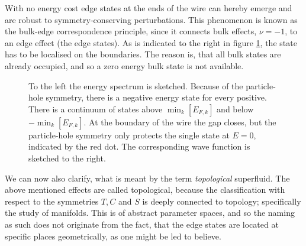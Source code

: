 With no energy cost edge states at the ends of the wire can hereby emerge and are robust to symmetry-conserving perturbations. This phenomenon is known as the bulk-edge correspondence principle, since it connects bulk effects, $\nu = -1$, to an edge effect (the edge states). As is indicated to the right in figure \ref{fig.edgestates}, the state has to be localised on the boundaries. The reason is, that all bulk states are already occupied, and so a zero energy bulk state is not available. 

\begin{figure}
\center
{}
\caption{To the left the energy spectrum is sketched. Because of the particle-hole symmetry, there is a negative energy state for every positive. There is a continuum of states above $\min_k[E_{F,k}]$ and below $-\min_k[E_{F,k}]$. At the boundary of the wire the gap closes, but the particle-hole symmetry only protects the single state at $E = 0$, indicated by the red dot. The corresponding wave function is sketched to the right.}
\label{fig.edgestates}
\end{figure}

We can now also clarify, what is meant by the term \textit{topological} superfluid. The above mentioned effects are called topological, because the classification with respect to the symmetries $T,C$ and $S$ is deeply connected to topology; specifically the study of manifolds. This is of abstract parameter spaces, and so the naming as such does not originate from the fact, that the edge states are located at specific places geometrically, as one might be led to believe.  

